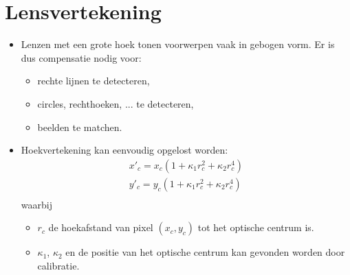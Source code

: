 \section{Lensvertekening}
\begin{itemize}
	\item Lenzen met een grote hoek tonen voorwerpen vaak in gebogen vorm. Er is dus compensatie nodig voor:
	\begin{itemize}
		\item rechte lijnen te detecteren,
		\item circles, rechthoeken, ... te detecteren,
		\item beelden te matchen.
	\end{itemize}
	\item Hoekvertekening kan eenvoudig opgelost worden:
	\begin{equation*}
		\begin{split}
			x'_c = x_c(1 + \kappa_1r^2_c + \kappa_2r^4_c) \\
			y'_c = y_c(1 + \kappa_1r^2_c + \kappa_2r^4_c) \\
		\end{split}
	\end{equation*}
	waarbij \begin{itemize}
		\item $r_c$ de hoekafstand van pixel $(x_c, y_c)$ tot het optische centrum is.
		\item $\kappa_1$, $\kappa_2$ en de positie van het optische centrum kan gevonden worden door calibratie.
	\end{itemize}
\end{itemize}

